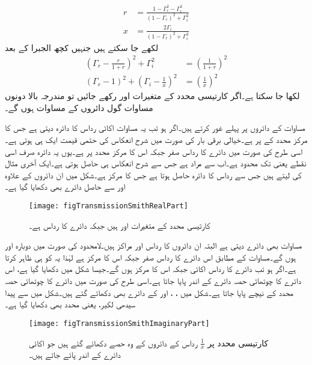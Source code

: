 \begin{align}
r&=\frac{1-\Gamma_r^2-\Gamma_i^2}{\left(1-\Gamma_r\right)^2+\Gamma_i^2}\\
x&=\frac{2\Gamma_i}{\left(1-\Gamma_r\right)^2+\Gamma_i^2}
\end{align}
لکھے جا سکتے ہیں جنہیں کچھ الجبرا کے بعد
\begin{align}
\left(\Gamma_r-\frac{r}{1+r}\right)^2+\Gamma_i^2&=\left(\frac{1}{1+r}\right)^2 \label{مساوات_ترسیلی_سمتھ_دائرہ_الف}\\
\left(\Gamma_r-1 \right)^2+\left(\Gamma_i-\frac{1}{x} \right)^2&=\left(\frac{1}{x}\right)^2  \label{مساوات_ترسیلی_سمتھ_دائرہ_ب}
\end{align}
لکھا جا سکتا ہے۔اگر کارتیسی محدد کے متغیرات  اور  رکھے جائیں تو مندرجہ بالا دونوں مساوات گول دائروں کے مساوات ہوں گے۔

مساوات  کے دائروں پر پہلے غور کرتے ہیں۔اگر  ہو تب یہ مساوات اکائی رداس کا دائرہ دیتی ہے جس کا مرکز محدد کے  پر ہے۔خیالی برقی بار کی صورت میں شرح انعکاس کی حتمی قیمت ایک ہی ہوتی ہے۔اسی طرح  کی صورت میں دائرے کا رداس صفر جبکہ اس کا مرکز محدد پر  ہے۔یوں یہ دائرہ صرف اسی نقطے یعنی  تک محدود ہے۔اب  سے مراد  ہے جس سے شرح انعکاس  ہی حاصل ہوتی ہے۔ایک آخری مثال  کی لیتے ہیں جس سے  رداس کا دائرہ حاصل ہوتا ہے جس کا مرکز  ہے۔شکل  میں ان دائروں کے علاوہ  اور  سے حاصل دائرے بھی  دکھایا گیا ہے۔ 

\begin{figure}
\centering
\texttt{[image: figTransmissionSmithRealPart]}
\caption{کارتیسی محدد کے متغیرات  اور  ہیں جبکہ دائرے کا رداس  ہے۔}
\label{شکل_ترسیلی_سمتھ-نقشہ_الف}
\end{figure}

مساوات  بھی دائرے دیتی ہے البتہ ان دائروں کا رداس  اور مراکز  ہیں۔لامحدود  کی صورت میں دوبارہ  اور  ہوں گے۔مساوات  کے مطابق اس دائرے کا رداس صفر جبکہ اس کا مرکز  ہے لہٰذا یہ  کو ہی ظاہر کرتا ہے۔اگر  ہو تب دائرے کا رداس اکائی جبکہ اس کا مرکز  ہوں گے۔جیسا شکل  میں دکھایا گیا ہے، اس دائرے کا چوتھائی حصہ  دائرے کے اندر پایا جاتا ہے۔اسی طرح  کی صورت میں دائرے کا چوتھائی حصہ   محدد کے نیچے پایا جاتا ہے۔شکل میں ، ،  اور  کے دائرے بھی دکھائے گئے ہیں۔شکل میں  سے پیدا سیدھی لکیر، یعنی  محدد بھی دکھایا گیا ہے۔
\begin{figure}
\centering
\texttt{[image: figTransmissionSmithImaginaryPart]}
\caption{کارتیسی محدد پر $\tfrac{1}{x}$ رداس کے دائروں کے وہ حصے دکھائے گئے ہیں جو اکائی دائرے کے اندر پائے جاتے ہیں۔}
\label{شکل_ترسیلی_سمتھ-نقشہ_ب}
\end{figure}

